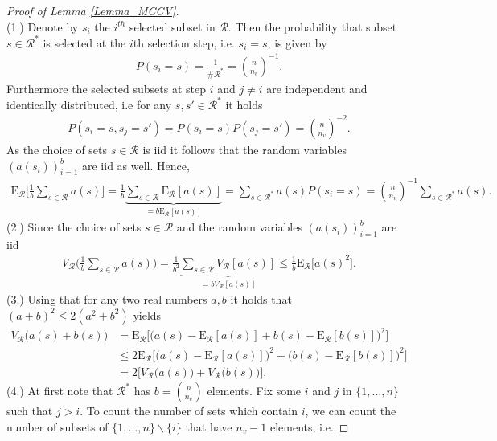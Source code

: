 \documentclass[Research_Module_ES.tex]{subfiles}
\begin{document}
\begin{proof}[Proof of Lemma \ref{Lemma_MCCV}]~\\
	(1.) Denote by $s_i$ the $i^{th}$ selected subset in $\mathcal{R}$. Then the probability that subset $s \in \mathcal{R}^\ast$ is selected at the $i$th selection step, i.e. $s_i=s$, is given by
	\begin{align*}
	P(s_i=s)= \frac{1}{\# \mathcal{R}^\ast} = \binom{n}{n_v}^{-1}.
	\end{align*}
	Furthermore the selected subsets at step $i$ and $j\neq i$ are independent and identically distributed, i.e for any $s,s'\in \mathcal{R}^\ast$ it holds
	\begin{align*}
	P(s_i=s,s_j=s')=P(s_i=s)P(s_j=s')=\binom{n}{n_v}^{-2}.
	\end{align*}
	As the choice of sets $s\in \mathcal{R}$ is iid it follows that the random variables $(a(s_i))_{i=1}^b$ are iid as well. Hence, 
	\begin{align*}
	\mathrm{E}_\mathcal{R} \biggl[ \frac{1}{b}\sum_{s\in \mathcal{R}}a(s)\biggr] 
	= \frac{1}{b}\underbrace{\sum_{s\in \mathcal{R}}\mathrm{E}_\mathcal{R} [a(s)]}_{=b\mathrm{E}_\mathcal{R}[a(s)]}
	= \sum_{s\in \mathcal{R}^\ast}a(s)P(s_i = s)
	=\binom{n}{n_v}^{-1}\sum_{s\in\mathcal{R}^\ast}a(s).
	\end{align*}
	(2.) Since the choice of sets $s\in \mathcal{R}$ and the random variables $(a(s_i))_{i=1}^b$ are iid
	\begin{align*}
	V_\mathcal{R} \biggl(\frac{1}{b}\sum_{s\in \mathcal{R}}a(s)\biggr)
	= \frac{1}{b^2}\underbrace{\sum_{s\in \mathcal{R}}V_\mathcal{R} [a(s)]}_{=bV_\mathcal{R} [a(s)]}
	\le \frac{1}{b}\mathrm{E}_\mathcal{R}\bigl[a(s)^2\bigr].
	\end{align*}
	(3.) Using that for any two real numbers $a,b$ it holds that $(a+b)^2\le 2(a^2+b^2)$ yields
	\begin{align*}
	V_\mathcal{R}\bigl(a(s)+b(s)\bigr) 
	&= \mathrm{E}_\mathcal{R}\bigl[\bigl(a(s)-\mathrm{E}_\mathcal{R}[a(s)] + b(s) - \mathrm{E}_\mathcal{R}[b(s)]\bigr)^2\bigr]\\
	&\le 2 \mathrm{E}_\mathcal{R}\bigl[\bigl(a(s)-\mathrm{E}_\mathcal{R}[a(s)] \bigr)^2+\bigl(b(s) - \mathrm{E}_\mathcal{R}[b(s)]\bigr)^2\bigr]\\
	&= 2\bigl[V_\mathcal{R}\bigl(a(s)\bigr)+V_\mathcal{R}\bigl(b(s)\bigr)\bigr]. 
	\end{align*}
	(4.) At first note that $\mathcal{R}^\ast$ has $b=\binom{n}{n_v}$ elements. Fix some $i$ and $j$ in $\{1,\dots, n\}$ such that $j>i$. To count the number of sets which contain $i$, we can count the number of subsets of $\{1,\dots, n\}\backslash\{i\}$ that have $n_v-1$ elements, i.e.

\end{proof}
\end{document}
